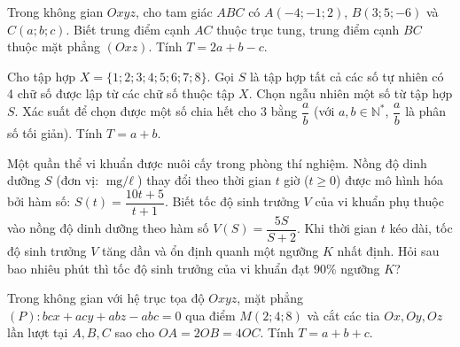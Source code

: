 \documentclass[12pt,a4paper]{article}
\providecommand{\macau}[1]{}
\begin{document}
\begin{ex}
	\macau{ID: DETHI2009-C19}Trong không gian $Oxyz$, cho tam giác $ABC$ có $A(-4; -1; 2)$, $B(3; 5; -6)$ và $C(a; b; c)$. Biết trung điểm cạnh $AC$ thuộc trục tung, trung điểm cạnh $BC$ thuộc mặt phẳng $(Oxz)$. Tính $T = 2a + b - c$.
	\par{}
	\loigiai{}
\end{ex}

\begin{ex}
	\macau{ID: DETHI2009-C20}Cho tập hợp $X = \{1; 2; 3; 4; 5; 6; 7; 8\}$. Gọi $S$ là tập hợp tất cả các số tự nhiên có 4 chữ số được lập từ các chữ số thuộc tập $X$. Chọn ngẫu nhiên một số từ tập hợp $S$. Xác suất để chọn được một số chia hết cho 3 bằng $\dfrac{a}{b}$ (với $a, b \in \mathbb{N}^*$, $\dfrac{a}{b}$ là phân số tối giản). Tính $T = a + b$.
	\par{}
	\loigiai{}
\end{ex}

\begin{ex}
	\macau{ID: DETHI2009-C21}Một quần thể vi khuẩn được nuôi cấy trong phòng thí nghiệm. Nồng độ dinh dưỡng $S$ (đơn vị: $\text{mg/}\ell$) thay đổi theo thời gian $t$ giờ ($t \geqslant 0$) được mô hình hóa bởi hàm số: $S(t) = \dfrac{10t + 5}{t + 1}$. Biết tốc độ sinh trưởng $V$ của vi khuẩn phụ thuộc vào nồng độ dinh dưỡng theo hàm số $V(S) = \dfrac{5S}{S + 2}$. Khi thời gian $t$ kéo dài, tốc độ sinh trưởng $V$ tăng dần và ổn định quanh một ngưỡng $K$ nhất định. Hỏi sau bao nhiêu phút thì tốc độ sinh trưởng của vi khuẩn đạt $90\%$ ngưỡng $K$?
	\par{}
	\loigiai{}
\end{ex}

\begin{ex}
	\macau{ID: DETHI2009-C22}Trong không gian với hệ trục tọa độ $Oxyz$, mặt phẳng $(P)\colon bcx + acy + abz - abc = 0$ qua điểm $M(2; 4; 8)$ và cắt các tia $Ox, Oy, Oz$ lần lượt tại $A, B, C$ sao cho $OA = 2OB = 4OC$. Tính $T = a + b + c$.
	\par{}
	\loigiai{}
\end{ex}
\end{document}
